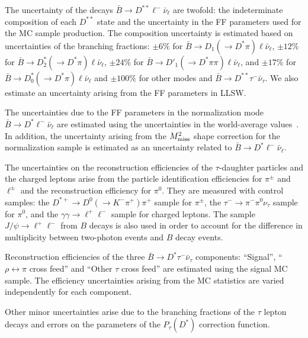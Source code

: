 \documentclass[aps,prd,twocolumn,superscriptaddress,showpacs,preprintnumbers,amsmath,amssymb]{revtex4-1}
\begin{document}
The uncertainty of the decays ${\bar B} \rightarrow D^{**} \ell^- {\bar \nu}_\ell$ are twofold: the indeterminate composition of each $D^{**}$ state and the uncertainty in the FF parameters used for the MC sample production. The composition uncertainty is estimated based on uncertainties of the branching fractions: $\pm 6\%$ for ${\bar B} \rightarrow D_1 (\rightarrow D^* \pi) \ell \bar{\nu}_\ell$, $\pm 12\%$ for ${\bar B} \rightarrow D_2^* (\rightarrow D^* \pi) \ell \bar{\nu}_\ell$, $\pm 24\%$ for ${\bar B} \rightarrow D'_1 (\rightarrow D^* \pi \pi) \ell \bar{\nu}_\ell$, and $\pm 17\%$ for ${\bar B} \rightarrow D_0^* (\rightarrow D^* \pi) \ell \bar{\nu}_\ell$ and $\pm 100\%$ for other modes and $\bar{B} \rightarrow D^{**} \tau^- \bar{\nu}_\tau$. We also estimate an uncertainty arising from the FF parameters in LLSW.

The uncertainties due to the FF parameters in the normalization mode ${\bar B} \rightarrow D^* \ell^- \bar{\nu}_\ell$ are estimated using the uncertainties in the world-average values~\cite{cite:HFLAV:2014}. In addition, the uncertainty arising from the $M_{\rm miss}^2$ shape correction for the normalization sample is estimated as an uncertainty related to ${\bar B} \rightarrow D^* \ell^- \bar{\nu}_\ell$.

The uncertainties on the reconstruction efficiencies of the $\tau$-daughter particles and the charged leptons arise from the particle identification efficiencies for $\pi^{\pm}$ and $\ell^{\pm}$ and the reconstruction efficiency for $\pi^0$. They are measured with control samples: the $D^{*+} \rightarrow D^0(\rightarrow K^- \pi^+)\pi^+$ sample for $\pi^{\pm}$, the $\tau^- \rightarrow \pi^- \pi^0 \nu_{\tau}$ sample for $\pi^0$, and the $\gamma \gamma \rightarrow \ell^+ \ell^-$ sample for charged leptons. The sample $J/\psi \rightarrow \ell^+ \ell^-$ from $B$ decays is also used in order to account for the difference in multiplicity between two-photon events and $B$ decay events.

Reconstruction efficiencies of the three ${\bar B} \rightarrow D^* \tau^- {\bar \nu}_\tau$ components: ``Signal'', ``$\rho \leftrightarrow \pi$ cross feed'' and ``Other $\tau$ cross feed'' are estimated using the signal MC sample. The efficiency uncertainties arising from the MC statistics are varied independently for each component.

Other minor uncertainties arise due to the branching fractions of the $\tau$ lepton decays and errors on the parameters of the $P_\tau(D^*)$ correction function.
\end{document}
